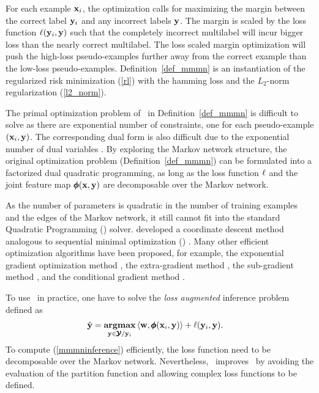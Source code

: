 {For each example $\mathbf {x}_i$, the optimization calls for maximizing the margin between the correct label $\mathbf {y}_i$ and any incorrect labels $\mathbf {y}$.
The margin is scaled by the loss function $\mathbf {\ell}(\mathbf {y}_i,{\mathbf {y}})$ such that the completely incorrect multilabel will incur bigger loss than the nearly correct multilabel.
The loss scaled margin optimization will push the high-loss pseudo-examples further away from the correct example than the low-loss pseudo-examples.
Definition~\ref{def_mmmn} is an instantiation of the regularized risk minimization (\ref{rl}) with the hamming loss and the $L_2$-norm regularization (\ref{l2_norm}).

The primal optimization problem of \mmmn\ in Definition~\ref{def_mmmn} is difficult to solve as there are exponential number of constraints, one for each pseudo-example $(\mathbf {x}_i,\mathbf {y})$.
The corresponding dual form is also difficult due to the exponential number of dual variables \citep{Taskar04max}.
By exploring the Markov network structure, the original optimization problem (Definition~\ref{def_mmmn}) can be formulated into a factorized dual quadratic programming, as long as the loss function $\mathbf {\ell}$ and the joint feature map $\pmb \phi(\mathbf {x},\mathbf {y})$ are decomposable over the Markov network.

As the number of parameters is quadratic in the number of training examples and the edges of the Markov network, it still cannot fit into the standard Quadratic Programming (\qp) solver. 
\citet{Taskar04max} developed a coordinate descent method analogous to sequential minimal optimization (\smo) \citep{Platt98sequential,Platt99fast}.
Many other efficient optimization algorithms have been proposed, for example, the exponential gradient optimization method \citep{bartlett04}, 
the extra-gradient method \citep{taskar06},
the sub-gradient method \citet{Ratliff07},
and the conditional gradient method \citep{Rousu06, Rousu07}.

To use \mmmn\ in practice, one have to solve the \textit{loss augmented} inference problem defined as
\begin{align}
	\hat{\mathbf {y}} = \underset{\mathbf {y}\in\pmb {\mathcal{Y}}/\mathbf {y}_i}{\textbf{argmax}} &\, \langle \mathbf {w}, \pmb \phi(\mathbf {x}_i,\mathbf {y}) \rangle + \mathbf {\ell}(\mathbf {y}_i,\mathbf {y}) \label{mmmninference}.
\end{align} 
To compute (\ref{mmmninference}) efficiently, the loss function need to be decomposable over the Markov network.
Nevertheless, \mmmn\ improves \crf\ by avoiding the evaluation of the partition function and allowing complex loss functions to be defined.



}
